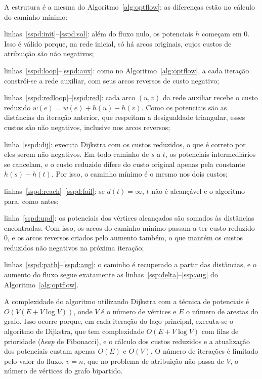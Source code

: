     A estrutura é a mesma do Algoritmo~\ref{alg:optflow}; as diferenças estão no cálculo do caminho mínimo:
    \begin{alineas}
        \item linhas~\ref{sspd:init}--\ref{sspd:sol}: além do fluxo nulo, os potenciais $h$ começam em $0$. Isso é válido porque, na rede inicial, só há arcos originais, cujos custos de atribuição são não negativos;
        \item linhas~\ref{sspd:loop}--\ref{sspd:aux}: como no Algoritmo~\ref{alg:optflow}, a cada iteração constrói-se a rede auxiliar, com seus arcos reversos de custo negativo;
        \item linhas~\ref{sspd:redloop}--\ref{sspd:red}: cada arco $(u,v)$ da rede auxiliar recebe o custo reduzido $\bar{w}(e) = w(e) + h(u) - h(v)$. Como os potenciais são as distâncias da iteração anterior, que respeitam a desigualdade triangular, esses custos são não negativos, inclusive nos arcos reversos;
        \item linha~\ref{sspd:dij}: executa Dijkstra com os custos reduzidos, o que é correto por eles serem não negativos. Em todo caminho de $s$ a $t$, os potenciais intermediários se cancelam, e o custo reduzido difere do custo original apenas pela constante $h(s) - h(t)$. Por isso, o caminho mínimo é o mesmo nos dois custos;
        \item linhas~\ref{sspd:reach}--\ref{sspd:fail}: se $d(t) = \infty$, $t$ não é alcançável e o algoritmo para, como antes;
        \item linha~\ref{sspd:upd}: os potenciais dos vértices alcançados são somados às distâncias encontradas. Com isso, os arcos do caminho mínimo passam a ter custo reduzido $0$, e os arcos reversos criados pelo aumento também, o que mantém os custos reduzidos não negativos na próxima iteração;
        \item linhas~\ref{sspd:path}--\ref{sspd:aug}: o caminho é recuperado a partir das distâncias, e o aumento do fluxo segue exatamente as linhas~\ref{ssp:delta}--\ref{ssp:aug} do Algoritmo~\ref{alg:optflow}.
    \end{alineas}

A complexidade do algoritmo utilizando Dijkstra com a técnica de potenciais é $O(V (E + V \log V))$, onde $V$ é o número de vértices e $E$ o número de arestas do grafo. Isso ocorre porque, em cada iteração do laço principal, executa-se o algoritmo de Dijkstra, que tem complexidade $O(E + V \log V)$ com filas de prioridade (\textit{heap} de Fibonacci), e o cálculo dos custos reduzidos e a atualização dos potenciais custam apenas $O(E)$ e $O(V)$. O número de iterações é limitado pelo valor do fluxo, $v = n$, que no problema de atribuição não passa de $V$, o número de vértices do grafo bipartido.

